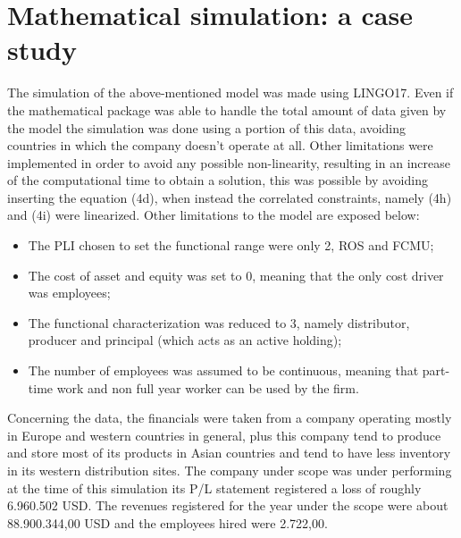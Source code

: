 \documentclass{article}
\begin{document}
\pagebreak

\section{Mathematical simulation: a case study}
The simulation of the above-mentioned model was made using LINGO17. Even if the mathematical package was able to handle the total amount of data given by the model the simulation was done using a portion of this data, avoiding countries in which the company doesn't operate at all. Other limitations were implemented in order to avoid any possible non-linearity, resulting in an increase of the computational time to obtain a solution, this was possible by avoiding inserting the equation (4d), when instead the correlated constraints, namely (4h) and (4i) were linearized. Other limitations to the model are exposed below:
\begin{itemize}
    \item The PLI chosen to set the functional range were only 2, ROS and FCMU;
    \item The cost of asset and equity was set to 0, meaning that the only cost driver was employees;
    \item The functional characterization was reduced to 3, namely distributor, producer and principal (which acts as an active holding);
    \item The number of employees was assumed to be continuous, meaning that part-time work and non full year worker can be used by the firm.
\end{itemize}

Concerning the data, the financials were taken from a company operating mostly in Europe and western countries in general, plus this company tend to produce and store most of its products in Asian countries and tend to have less inventory in its western distribution sites. The company under scope was under performing at the time of this simulation its P/L statement registered a loss of roughly  6.960.502 USD. The revenues registered for the year under the scope were about 88.900.344,00 USD and the employees hired were 2.722,00.
\end{document}
